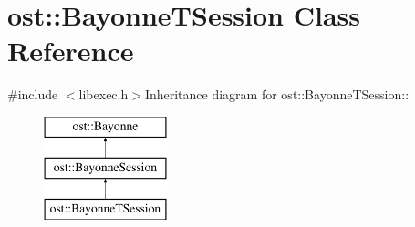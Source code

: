 \section{ost::BayonneTSession Class Reference}
\label{classost_1_1_bayonne_t_session}


{\ttfamily \#include $<$libexec.h$>$}Inheritance diagram for ost::BayonneTSession::\begin{figure}[H]
\begin{center}
\leavevmode
\includegraphics[height=3cm]{classost_1_1_bayonne_t_session}
\end{center}
\end{figure}
